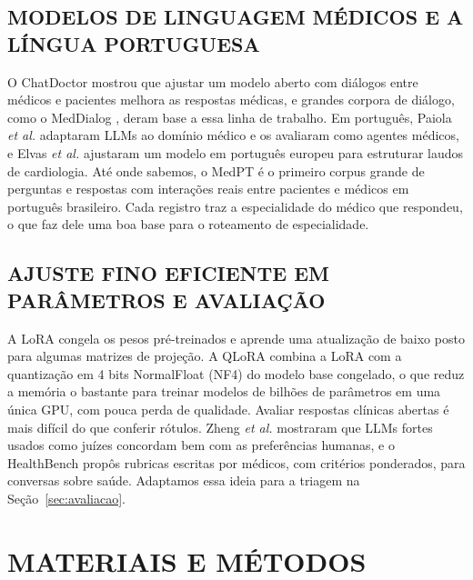 \documentclass{ieeeaccess}
\begin{document}
\subsection{MODELOS DE LINGUAGEM M\'EDICOS E A L\'INGUA PORTUGUESA}
O ChatDoctor \cite{b7} mostrou que ajustar um modelo aberto com di\'alogos entre m\'edicos e pacientes melhora as respostas m\'edicas, e grandes corpora de di\'alogo, como o MedDialog \cite{b16}, deram base a essa linha de trabalho. Em portugu\^es, Paiola \emph{et al.} \cite{b17} adaptaram LLMs ao dom\'inio m\'edico e os avaliaram como agentes m\'edicos, e Elvas \emph{et al.} \cite{b18} ajustaram um modelo em portugu\^es europeu para estruturar laudos de cardiologia. At\'e onde sabemos, o MedPT \cite{b8} \'e o primeiro corpus grande de perguntas e respostas com intera\c{c}\~oes reais entre pacientes e m\'edicos em portugu\^es brasileiro. Cada registro traz a especialidade do m\'edico que respondeu, o que faz dele uma boa base para o roteamento de especialidade.

\subsection{AJUSTE FINO EFICIENTE EM PAR\^AMETROS E AVALIA\c{C}\~AO}
A LoRA \cite{b12} congela os pesos pr\'e-treinados e aprende uma atualiza\c{c}\~ao de baixo posto para algumas matrizes de proje\c{c}\~ao. A QLoRA \cite{b13} combina a LoRA com a quantiza\c{c}\~ao em 4 bits NormalFloat (NF4) do modelo base congelado, o que reduz a mem\'oria o bastante para treinar modelos de bilh\~oes de par\^ametros em uma \'unica GPU, com pouca perda de qualidade. Avaliar respostas cl\'inicas abertas \'e mais dif\'icil do que conferir r\'otulos. Zheng \emph{et al.} \cite{b19} mostraram que LLMs fortes usados como ju\'izes concordam bem com as prefer\^encias humanas, e o HealthBench \cite{b20} prop\^os rubricas escritas por m\'edicos, com crit\'erios ponderados, para conversas sobre sa\'ude. Adaptamos essa ideia para a triagem na Se\c{c}\~ao~\ref{sec:avaliacao}.

\section{MATERIAIS E M\'ETODOS}
\label{sec:metodos}
\end{document}

